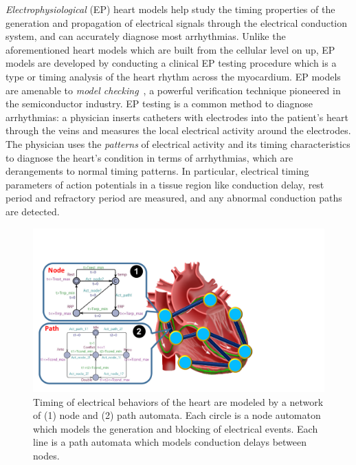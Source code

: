 \emph{Electrophysiological} (EP) heart models help study the timing properties of the generation and propagation of electrical signals through the electrical conduction system, and can accurately diagnose most arrhythmias. 
Unlike the aforementioned heart models which are built from the cellular level on up, EP models are developed by conducting a clinical EP testing procedure which is a type or timing analysis of the heart rhythm across the myocardium. EP models are amenable to \emph{model checking}~\cite{model_checking}, a powerful verification technique pioneered in the semiconductor industry.
EP testing is a common method to diagnose arrhythmias: 
a physician inserts catheters with electrodes into the patient's heart through the veins and measures the local electrical activity around the electrodes. 
The physician uses the \emph{patterns} of electrical activity and its timing characteristics to diagnose the heart's condition in terms of arrhythmias, which are derangements to normal timing patterns. 
In particular, electrical timing parameters of action potentials in a tissue region like conduction delay, rest period and refractory period are measured, and any abnormal conduction paths are detected.
\begin{figure}[t]
	\centering
	\includegraphics[width=\textwidth]{figs/Pacemaker.pdf}
	\caption{\small Timing of electrical behaviors of the heart are modeled by a network of (1) node and (2) path automata. Each circle is a node automaton which models the generation and blocking of electrical events. Each line is a path automata which models conduction delays between nodes.}
	\label{fig:EP}
\end{figure} 

